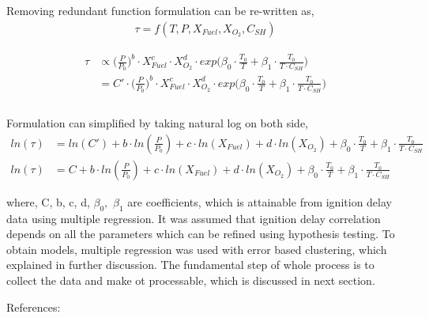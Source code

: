 \documentclass[preprint,12pt]{elsarticle}
\begin{document}
	 	 Removing redundant function formulation can be re-written  as,
	 	\begin{equation}\label{eq:func}
	 	\begin{aligned}
	 	\tau = f(T,P,X_{Fuel},X_{O_2},C_{SH})
	 	\end{aligned} 
	 	\end{equation}
	 	
	 		\begin{equation}
	 		\begin{aligned}
	 		\tau &\propto \bigg(\frac{P}{P_0}\bigg)^b  \cdot X_{Fuel}^c    \cdot X_{O_2}^d    \cdot exp\Bigg( \beta_0 \cdot \frac{T_0}{T} + \beta_1 \cdot \frac{T_0}{T \cdot C_{SH}} \Bigg) \\
	 		&= C' \cdot \bigg(\frac{P}{P_0}\bigg)^b  \cdot X_{Fuel}^c    \cdot X_{O_2}^d    \cdot exp\Bigg( \beta_0 \cdot \frac{T_0}{T} + \beta_1 \cdot \frac{T_0}{T \cdot C_{SH}} \Bigg) \\\\
	 		\end{aligned}
	 		\end{equation}
	 		
	 	Formulation can simplified by taking natural log on both side,
		\begin{equation}\label{eq:hypo_ignition}
			\begin{aligned}
			ln(\tau) &= ln(C') + b \cdot ln(\frac{P}{P_0})+ c \cdot ln(X_{Fuel})+    d \cdot ln(X_{O_2}) + \beta_0 \cdot \frac{T_0}{T} + \beta_1 \cdot \frac{T_0}{T \cdot C_{SH}} \\
			ln(\tau) &= C + b \cdot ln(\frac{P}{P_0})+ c \cdot ln(X_{Fuel})+    d \cdot ln(X_{O_2}) + \beta_0 \cdot \frac{T_0}{T} + \beta_1 \cdot \frac{T_0}{T \cdot C_{SH}}
			\end{aligned}
		\end{equation}
		
		
		
		where, C, b, c, d, $\beta_0,$ $\beta_1$ are coefficients, which is attainable from ignition delay data using multiple regression. It was assumed that ignition delay correlation depends on all the parameters which can be refined using hypothesis testing. To obtain models, multiple regression was used with error based clustering, which explained in further discussion. The fundamental step of whole process is to collect the data and make ot processable, which is discussed in next section.
		
		
				
				\newpage	
			References:
					
\end{document}
